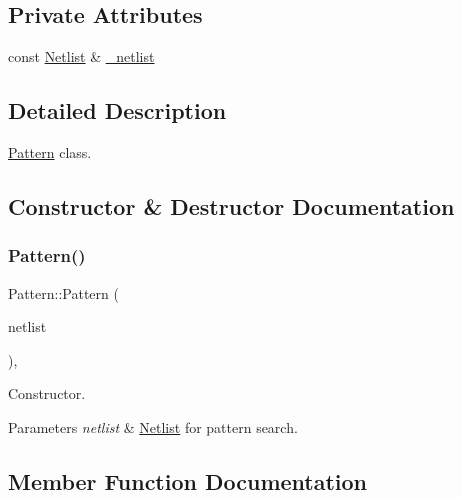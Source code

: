 \subsection*{Private Attributes}
\begin{DoxyCompactItemize}
\item 
const \hyperlink{classNetlist}{Netlist} \& \hyperlink{classPattern_a71ec4e16ee6088587cece41cb7b027a3}{\+\_\+netlist}
\end{DoxyCompactItemize}


\subsection{Detailed Description}
\hyperlink{classPattern}{Pattern} class. 

\subsection{Constructor \& Destructor Documentation}
\mbox{\label{classPattern_a11345fc22f0ff9a01cff037c5a3e5115}} 
\subsubsection{\texorpdfstring{Pattern()}{Pattern()}}
{\footnotesize\ttfamily Pattern\+::\+Pattern (\begin{DoxyParamCaption}\item[{const \hyperlink{classNetlist}{Netlist} \&}]{netlist }\end{DoxyParamCaption})\hspace{0.3cm}{\ttfamily [inline]}, {\ttfamily [explicit]}}



Constructor. 


\begin{DoxyParams}{Parameters}
{\em netlist} & \hyperlink{classNetlist}{Netlist} for pattern search. \\
\hline
\end{DoxyParams}


\subsection{Member Function Documentation}
\mbox{\label{classPattern_acbeabf067e49ed1ea743d647f541a3f4}} 
